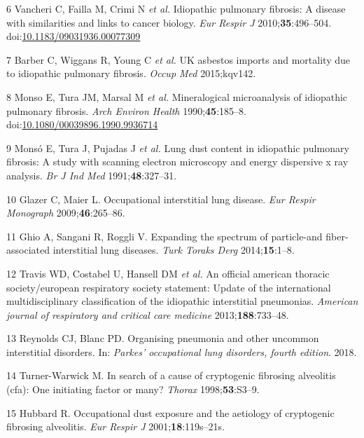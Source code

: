 \documentclass[12pt,a4paper,]{report}
\begin{document}
\leavevmode\hypertarget{ref-Vancheri2010}{}%
6 Vancheri C, Failla M, Crimi N \emph{et al.} Idiopathic pulmonary
fibrosis: A disease with similarities and links to cancer biology.
\emph{Eur Respir J} 2010;\textbf{35}:496--504.
doi:\href{https://doi.org/10.1183/09031936.00077309}{10.1183/09031936.00077309}

\leavevmode\hypertarget{ref-Barber2015}{}%
7 Barber C, Wiggans R, Young C \emph{et al.} UK asbestos imports and
mortality due to idiopathic pulmonary fibrosis. \emph{Occup Med}
2015;kqv142.

\leavevmode\hypertarget{ref-Monso1990}{}%
8 Monso E, Tura JM, Marsal M \emph{et al.} Mineralogical microanalysis
of idiopathic pulmonary fibrosis. \emph{Arch Environ Health}
1990;\textbf{45}:185--8.
doi:\href{https://doi.org/10.1080/00039896.1990.9936714}{10.1080/00039896.1990.9936714}

\leavevmode\hypertarget{ref-Monso1991}{}%
9 Monsó E, Tura J, Pujadas J \emph{et al.} Lung dust content in
idiopathic pulmonary fibrosis: A study with scanning electron microscopy
and energy dispersive x ray analysis. \emph{Br J Ind Med}
1991;\textbf{48}:327--31.

\leavevmode\hypertarget{ref-Glazer2009}{}%
10 Glazer C, Maier L. Occupational interstitial lung disease. \emph{Eur
Respir Monograph} 2009;\textbf{46}:265--86.

\leavevmode\hypertarget{ref-Ghio2014}{}%
11 Ghio A, Sangani R, Roggli V. Expanding the spectrum of particle-and
fiber-associated interstitial lung diseases. \emph{Turk Toraks Derg}
2014;\textbf{15}:1--8.

\leavevmode\hypertarget{ref-Travis2013}{}%
12 Travis WD, Costabel U, Hansell DM \emph{et al.} An official american
thoracic society/european respiratory society statement: Update of the
international multidisciplinary classification of the idiopathic
interstitial pneumonias. \emph{American journal of respiratory and
critical care medicine} 2013;\textbf{188}:733--48.

\leavevmode\hypertarget{ref-Reynolds2017}{}%
13 Reynolds CJ, Blanc PD. Organising pneumonia and other uncommon
interstitial disorders. In: \emph{Parkes' occupational lung disorders,
fourth edition}. 2018.

\leavevmode\hypertarget{ref-Turner-Warwick1998}{}%
14 Turner-Warwick M. In search of a cause of cryptogenic fibrosing
alveolitis (cfa): One initiating factor or many? \emph{Thorax}
1998;\textbf{53}:S3--9.

\leavevmode\hypertarget{ref-Hubbard2001}{}%
15 Hubbard R. Occupational dust exposure and the aetiology of
cryptogenic fibrosing alveolitis. \emph{Eur Respir J}
2001;\textbf{18}:119s--21s.
\end{document}
